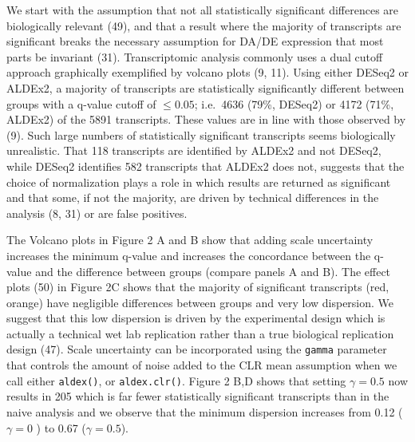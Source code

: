 \documentclass[
]{article}
\begin{document}
We start with the assumption that not all statistically significant
differences are biologically relevant (49), and that a result where the
majority of transcripts are significant breaks the necessary assumption
for DA/DE expression that most parts be invariant (31). Transcriptomic
analysis commonly uses a dual cutoff approach graphically exemplified by
volcano plots (9, 11). Using either DESeq2 or ALDEx2, a majority of
transcripts are statistically significantly different between groups
with a q-value cutoff of \(\le 0.05\); i.e.~4636 (79\%, DESeq2) or 4172
(71\%, ALDEx2) of the 5891 transcripts. These values are in line with
those observed by (9). Such large numbers of statistically significant
transcripts seems biologically unrealistic. That 118 transcripts are
identified by ALDEx2 and not DESeq2, while DESeq2 identifies 582
transcripts that ALDEx2 does not, suggests that the choice of
normalization plays a role in which results are returned as significant
and that some, if not the majority, are driven by technical differences
in the analysis (8, 31) or are false positives.

The Volcano plots in Figure 2 A and B show that adding scale uncertainty
increases the minimum q-value and increases the concordance between the
q-value and the difference between groups (compare panels A and B). The
effect plots (50) in Figure 2C shows that the majority of significant
transcripts (red, orange) have negligible differences between groups and
very low dispersion. We suggest that this low dispersion is driven by
the experimental design which is actually a technical wet lab
replication rather than a true biological replication design (47). Scale
uncertainty can be incorporated using the \texttt{gamma} parameter that
controls the amount of noise added to the CLR mean assumption when we
call either \texttt{aldex()}, or \texttt{aldex.clr()}. Figure 2 B,D
shows that setting \(\gamma=0.5\) now results in 205 which is far fewer
statistically significant transcripts than in the naive analysis and we
observe that the minimum dispersion increases from 0.12 (\(\gamma = 0\)
) to 0.67 (\(\gamma=0.5\)).
\end{document}
